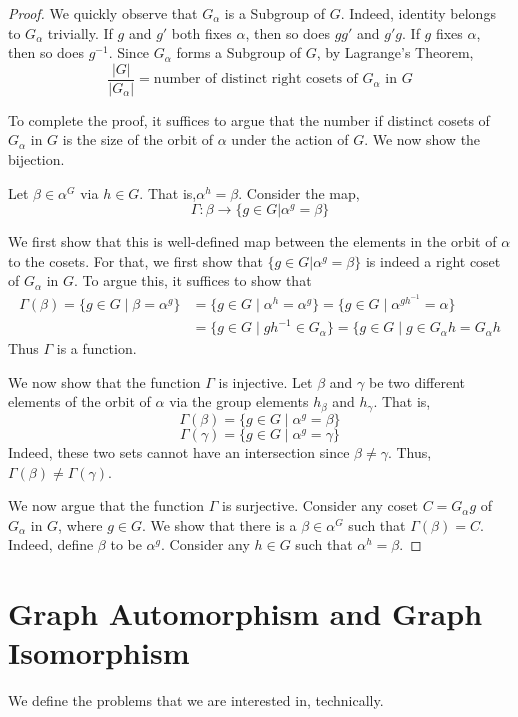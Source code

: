 \begin{proof}
We quickly observe that $G_{\alpha}$ is a Subgroup of $G$. Indeed, identity belongs to $G_\alpha$ trivially. If $g$ and $g'$ both fixes $\alpha$, then so does $gg'$ and $g'g$. If $g$ fixes $\alpha$, then so does $g^{-1}$. Since $G_{\alpha}$ forms a Subgroup of $G$, by Lagrange's Theorem,
$$\frac{|G|}{|G_{\alpha}|} = \mbox{number of distinct right cosets of $G_\alpha$ in $G$}$$ 


To complete the proof, it suffices to argue that the number if distinct cosets of $G_\alpha$ in $G$ is the size of the orbit of $\alpha$ under the action of $G$. We now show the bijection.

Let $\beta \in \alpha^G$ via $h \in G$. That is,$\alpha^h = \beta$. Consider the map,
$$\Gamma : \beta \rightarrow \{g \in G| \alpha^g = \beta \} $$

We first show that this is well-defined map between the elements in the orbit of $\alpha$ to the cosets. For that, we first show that  $\{g \in G| \alpha^g = \beta \}$ is indeed a right coset of $G_\alpha$ in $G$. To argue this, it suffices to show that 
\begin{align*}
\Gamma(\beta) = \{g \in G\mid \beta = \alpha^g\} &= \{ g \in G \mid \alpha^h = \alpha^g \} = \{ g \in G \mid \alpha^{gh^{-1}} = \alpha\} \\
 & = \{ g \in G \mid gh^{-1} \in G_{\alpha} \} = \{ g \in G \mid g \in G_{\alpha}h = G_\alpha h
\end{align*}
Thus $\Gamma$ is a function.

We now show that the function $\Gamma$ is injective. Let $\beta$ and $\gamma$ be two different elements of the orbit of $\alpha$ via the group elements $h_{\beta}$ and $h_{\gamma}$. That is, 
$$ \Gamma(\beta) = \{ g \in G \mid \alpha^g = \beta \} $$
$$ \Gamma(\gamma) = \{ g \in G \mid \alpha^g = \gamma \} $$
Indeed, these two sets cannot have an intersection since $\beta \neq \gamma$. Thus, $\Gamma(\beta) \ne \Gamma(\gamma)$.

We now argue that the function $\Gamma$ is surjective. Consider any coset $C = G_\alpha g$ of $G_\alpha$ in $G$, where $g \in G$. We show that there is a $\beta \in \alpha^G$ such that $\Gamma(\beta) = C$. Indeed, define $\beta$ to be $\alpha^g$. Consider any $h \in G$ such that $\alpha^h = \beta$. 
\end{proof}

\section{Graph Automorphism and Graph Isomorphism}
We define the problems that we are interested in, technically.

